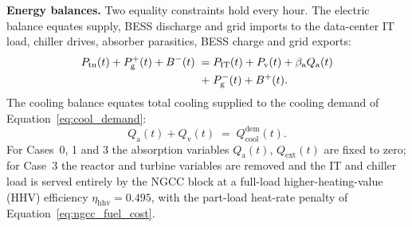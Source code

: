 \documentclass[sn-vancouver,Numbered]{sn-jnl}%
\newcommand{\runinhead}[1]{\par\smallskip\noindent\textbf{#1.}\quad}
\begin{document}
\runinhead{Energy balances}
Two equality constraints hold every hour. The electric balance equates supply, BESS discharge and grid imports to the data-center IT load, chiller drives, absorber parasitics, BESS charge and grid exports:
\begin{align}
\label{eq:elec_balance}
P_{\mathrm{tn}}(t) + P_{\mathrm{g}}^{+}(t) + B^{-}(t)
\;=\; & P_{\mathrm{IT}}(t) + P_{\mathrm{v}}(t) + \beta_{\mathrm{a}} Q_{\mathrm{a}}(t) \notag\\
\;+\; & P_{\mathrm{g}}^{-}(t) + B^{+}(t).
\end{align}
The cooling balance equates total cooling supplied to the cooling demand of Equation~\eqref{eq:cool_demand}:
\begin{equation}
\label{eq:cool_balance}
Q_{\mathrm{a}}(t) + Q_{\mathrm{v}}(t) \;=\; Q_{\mathrm{cool}}^{\mathrm{dem}}(t).
\end{equation}
For Cases~0, 1 and 3 the absorption variables $Q_{\mathrm{a}}(t)$, $Q_{\mathrm{ext}}(t)$ are fixed to zero; for Case~3 the reactor and turbine variables are removed and the IT and chiller load is served entirely by the NGCC block at a full-load higher-heating-value (HHV) efficiency $\eta_{\mathrm{hhv}}=0.495$, with the part-load heat-rate penalty of Equation~\eqref{eq:ngcc_fuel_cost}.
\end{document}
